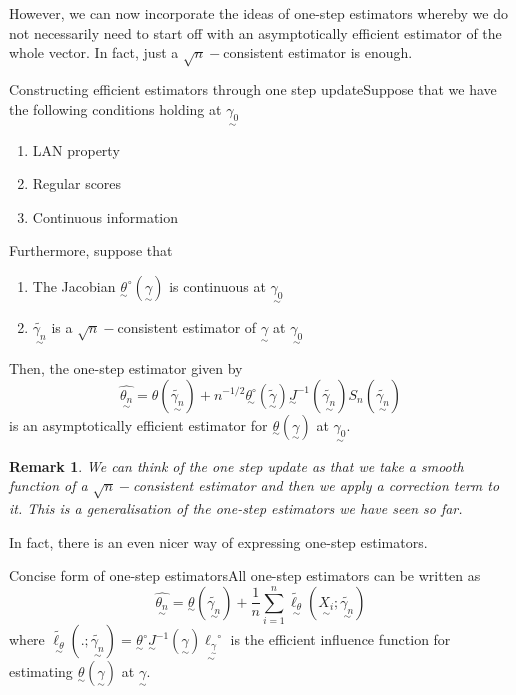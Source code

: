 \documentclass[twoside]{article}
\newtheorem{remark}[theorem]{Remark}
\newcommand{\utilde}{\underset{\sim}}
\begin{document}
\newpage
However, we can now incorporate the ideas of one-step estimators whereby we do not necessarily need to start off with an asymptotically efficient estimator of the whole vector. In fact, just a $\sqrt{n}-$consistent estimator is enough.
\begin{proposition_exam}{Constructing efficient estimators through one step update}{}Suppose that we have the following conditions holding at $\utilde{\gamma_0}$
\begin{enumerate}
\item LAN property
\item Regular scores 
\item Continuous information
\end{enumerate}
Furthermore, suppose that 
\begin{enumerate}
\item The Jacobian $\utilde{\theta}^{\circ}(\utilde{\gamma})$ is continuous at $\utilde{\gamma_0}$
\item $\utilde{\tilde{\gamma_n}}$ is a $\sqrt{n}-$consistent estimator of $\utilde{\gamma}$ at $\utilde{\gamma_0}$
\end{enumerate}
Then, the one-step estimator given by 
$$
\utilde{\hat{\theta_n}} = \theta(\utilde{\tilde{\gamma_n}}) + n^{-1/2}\utilde{\theta^{\circ}}(\utilde{\tilde{\gamma}})\utilde{J}^{-1}(\utilde{\tilde{\gamma_n}})S_n(\utilde{\tilde{\gamma_n}})
$$
is an asymptotically efficient estimator for $\utilde{\theta}(\utilde{\gamma})$ at $\utilde{\gamma_0}.$
\end{proposition_exam}

\begin{remark}We can think of the one step update as that we take a smooth function of a $\sqrt{n}-$consistent estimator and then we apply a correction term to it. This is a generalisation of the one-step estimators we have seen so far.
\end{remark}

In fact, there is an even nicer way of expressing one-step estimators.

\begin{proposition_exam}{Concise form of one-step estimators}{}All one-step estimators can be written as 
$$
\hat{\utilde{\theta_n}} = \utilde{\theta}(\tilde{\utilde{\gamma_n}}) + \frac{1}{n}\sum_{i=1}^{n}\tilde{\utilde{\ell_{\theta}}}(\utilde{X_i}; \tilde{\utilde{\gamma_n}})
$$
where $\tilde{\utilde{\ell_{\theta}}}(.; \tilde{\utilde{\gamma_n}}) = \utilde{\theta}^{\circ}\utilde{J}^{-1}(\utilde{\gamma})\utilde{\ell_{\utilde{\gamma}}}^{\circ}$ is the efficient influence function for estimating $\utilde{\theta}(\utilde{\gamma})$ at $\utilde{\gamma}.$
\end{proposition_exam}
\end{document}
